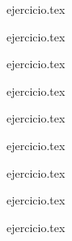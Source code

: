 \begin{enumerate}
    \begin{minipage}{0.45\textwidth}
    \setcounter{enumi}{42}
    {ejercicio.tex}
    \addtocounter{enumi}{1}
    {ejercicio.tex}
    \addtocounter{enumi}{1}
    {ejercicio.tex}
    \addtocounter{enumi}{1}
    {ejercicio.tex}
    \end{minipage}%
    \begin{minipage}{0.45\textwidth}
    \setcounter{enumi}{43}
    {ejercicio.tex}
    \addtocounter{enumi}{1}
    {ejercicio.tex}
    \addtocounter{enumi}{1}
    {ejercicio.tex}
    \addtocounter{enumi}{1}
    {ejercicio.tex}
    \end{minipage}

    \setcounter{enumi}{50}
    {ejercicio.tex}
\end{enumerate}
